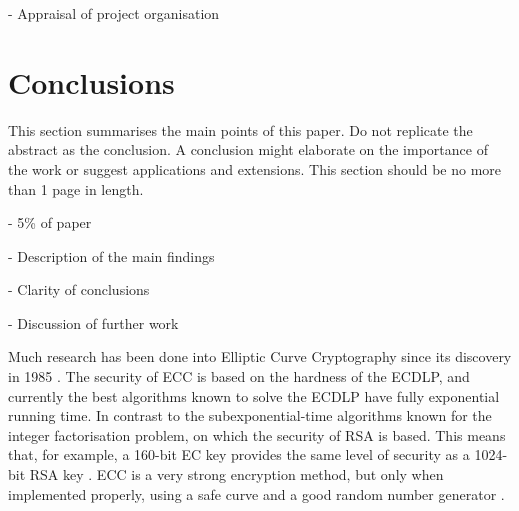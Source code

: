 \documentclass[12pt,a4paper]{article}
\begin{document}
- Appraisal of project organisation


\section{Conclusions}
This section summarises the main points of this paper. 
Do not replicate the abstract as the conclusion. 
A conclusion might elaborate on the importance of the work or suggest applications and extensions. 
This section should be no more than 1 page in length. 

- 5\% of paper

- Description of the main findings

- Clarity of conclusions

- Discussion of further work

Much research has been done into Elliptic Curve Cryptography since its discovery in 1985 \cite{10.1007/3-540-39799-X_31,koblitz1987elliptic}. 
The security of ECC is based on the hardness of the ECDLP, 
and currently the best algorithms known to solve the ECDLP have fully exponential running time. 
In contrast to the subexponential-time algorithms known for the integer factorisation problem, 
on which the security of RSA is based. 
This means that, for example, a 160-bit EC key provides the same level of security as a 1024-bit RSA key \cite{hankerson2003guide,silverman2009arithmetic}. 
ECC is a very strong encryption method, but only when implemented properly, 
using a safe curve \cite{bernstein2013safecurves,10.1007/11745853_14}
and a good random number generator \cite{hotz2010console}. 



\end{document}
